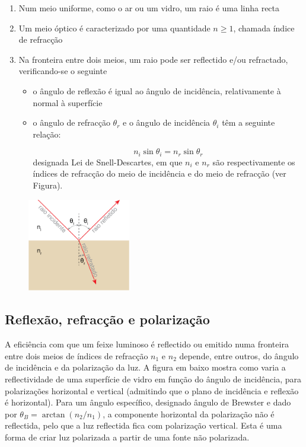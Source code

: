 \documentclass[a4paper,12pt]{article}      %
\begin{document}
\begin{enumerate}
\item Num meio uniforme, como o ar ou um vidro, um raio é uma linha recta
\item Um meio óptico é caracterizado por uma quantidade $n\geq1$, chamada índice de refracção
\item Na fronteira entre dois meios, um raio pode ser reflectido e/ou refractado, verificando-se o seguinte
\begin{itemize}
\item o ângulo de reflexão é igual ao ângulo de incidência, relativamente à normal à superfície
\item o ângulo de refracção $\theta_r$ e o ângulo de incidência $\theta_i$ têm a seguinte relação:

\begin{equation}
n_i\sin{\theta_i}=n_r\sin{\theta_r}
\end{equation}
designada Lei de Snell-Descartes, em que $n_i$ e $n_r$ são respectivamente os índices de refracção do meio de incidência e do meio de refracção (ver Figura).
\end{itemize}

\end{enumerate}

\begin{figure}
	[!hb]  \centering 
	\includegraphics[width=0.4\textwidth]{1-snell}
\end{figure}

\subsection{\sf Reflexão, refracção e polarização}

A eficiência com que um feixe luminoso é reflectido ou emitido numa fronteira entre dois meios de índices de refracção $n_1$ e $n_2$ depende, entre outros, do ângulo de incidência e da polarização da luz. A figura em baixo mostra como varia a reflectividade de uma superfície de vidro em função do ângulo de incidência, para polarizações horizontal e vertical (admitindo que o plano de incidência e reflexão é horizontal). Para um ângulo específico, designado ângulo de Brewster e dado por $\theta_B=\arctan(n_2/n_1)$, a componente horizontal da polarização não é reflectida, pelo que a luz reflectida fica com polarização vertical. Esta é uma forma de criar luz polarizada a partir de uma fonte não polarizada.
\end{document}

